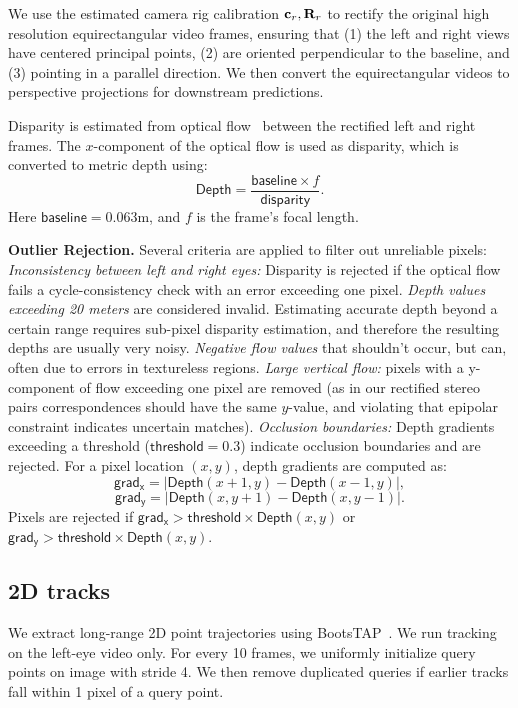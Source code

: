 We use the estimated camera rig calibration $\mathbf{c}_r, \mathbf{R}_r$ to rectify the original  high resolution equirectangular video frames, ensuring that (1) the left and right views have centered principal points, (2) are oriented perpendicular to the baseline, and (3) pointing in a parallel direction.  We then convert the equirectangular videos to  perspective projections for downstream predictions.

Disparity is estimated from optical flow~\cite{teed2020raft, sun2022disentangling} between the rectified left and right frames. 
The $x$-component of the optical flow is used as disparity, which is converted to metric depth using:
\begin{equation}
    \mathsf{Depth} = \frac{\mathsf{baseline}  \times f}{\mathsf{disparity}}.
\end{equation}
Here $\mathsf{baseline}=0.063$m, and $f$ is the frame's focal length.

\medskip
\noindent \textbf{Outlier Rejection.} Several criteria are applied to filter out unreliable pixels: \emph{Inconsistency between left and right eyes:} Disparity is rejected if the optical flow fails a cycle-consistency check with an error exceeding one pixel. \emph{Depth values exceeding 20 meters} are considered invalid. Estimating accurate depth beyond a certain range requires sub-pixel disparity estimation, and therefore the resulting depths are usually very noisy.
\emph{Negative flow values} that shouldn't occur, but can, often due to errors in textureless regions.
\emph{Large vertical flow:} pixels with a y-component of flow exceeding one pixel are removed (as in our rectified stereo pairs correspondences should have the same $y$-value, and violating that epipolar constraint indicates uncertain matches).
\emph{Occlusion boundaries:} Depth gradients exceeding a threshold ($\mathsf{threshold} = 0.3$) indicate occlusion boundaries and are rejected. For a pixel location $(x, y)$, depth gradients are computed as:
$$\mathsf{grad_x}=|{\mathsf{Depth}(x+1, y)-\mathsf{Depth}(x-1,y)} |,$$ $$\mathsf{grad_y}=|{\mathsf{Depth}(x, y+1)-\mathsf{Depth}(x,y-1)} |.$$
Pixels are rejected if $\mathsf{grad_x} > \mathsf{threshold} \times \mathsf{Depth}(x,y)$ or  $\mathsf{grad_y} > \mathsf{threshold} \times \mathsf{Depth}(x,y)$.

\subsection{2D tracks}
We extract long-range 2D point trajectories using BootsTAP~\cite{doersch2024bootstap}. 
We run tracking on the left-eye video only. 
For every 10 frames, we uniformly initialize query points on image with stride 4. We then remove duplicated queries if earlier tracks fall within 1 pixel of a query point.

